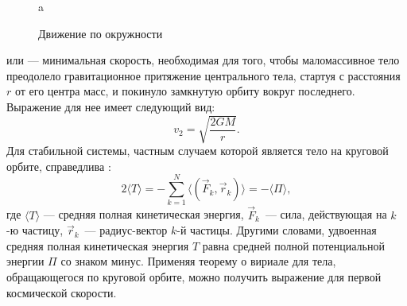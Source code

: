 \begin{wrapfigure}[10]{r}{.5\tw}
	\centering
	\vspace{-1pc}
	a	\caption{Движение по окружности \label{pic:orb-vel}}
\end{wrapfigure}

 или  ---
минимальная скорость, необходимая для того, чтобы маломассивное тело преодолело гравитационное притяжение центрального тела, стартуя с расстояния $r$ от его центра масс, и покинуло замкнутую орбиту вокруг
последнего. Выражение для нее имеет следующий вид:
\begin{equation}
	v_{2}=\sqrt{\frac{2GM}{r}}.
\end{equation}
Для стабильной системы, частным случаем которой является тело на круговой орбите, справедлива
:
\begin{equation}
	2 \langle T\rangle
	= -\sum _{{k=1}}^{N}\langle (\vec{F}_{k}, \vec{r}_{k})\rangle
	= -\langle \Pi \rangle,
\end{equation}
где $\langle T\rangle$ --- средняя полная кинетическая энергия, $\vec{F}_k$~--- сила,
действующая на $k$-ю частицу, $\vec{r}_k$~--- радиус-вектор $k$-й частицы. Другими словами, удвоенная средняя полная
кинетическая энергия $T$ равна средней полной потенциальной энергии $\Pi$ со знаком минус. Применяя теорему о вириале для тела, обращающегося по круговой орбите, можно
получить выражение для первой космической скорости.
